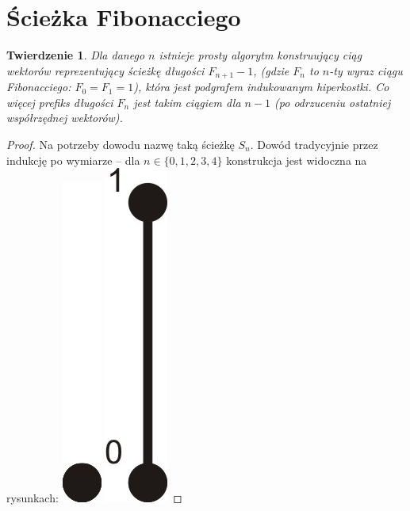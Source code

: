 \documentclass{pracamgr}
\newtheorem{theorem}{Twierdzenie}[chapter]
\begin{document}
   \section{Ścieżka Fibonacciego}
    \begin{theorem}\label{co najmniej fibo}
     Dla danego $n$ istnieje prosty algorytm konstruujący ciąg wektorów reprezentujący ścieżkę długości $F_{n+1}-1$,
     (gdzie $F_n$ to $n$-ty wyraz ciągu Fibonacciego: $F_0=F_1=1$), która jest podgrafem indukowanym hiperkostki.
     Co więcej prefiks długości $F_{n}$ jest takim ciągiem dla $n-1$ (po odrzuceniu ostatniej współrzędnej wektorów).
    \end{theorem}
    \begin{proof}
     Na potrzeby dowodu nazwę taką ścieżkę $S_n$.
     Dowód tradycyjnie przez indukcję po wymiarze -- dla $n\in\{0,1,2,3,4\}$ konstrukcja jest widoczna na rysunkach:\newline
     \hspace*{0pt}\includegraphics[scale=0.6]{img/Q0_long_path.jpg}
     \hspace*{12pt}\includegraphics[scale=0.6]{img/Q1_long_path.jpg}

\end{proof}
\end{document}
